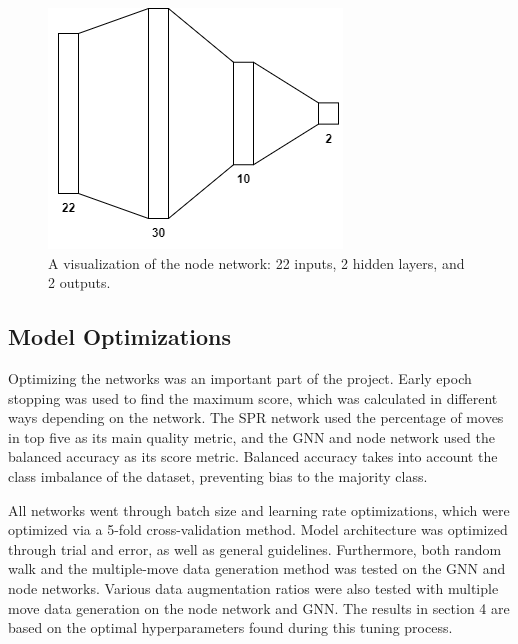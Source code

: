 \documentclass{mpaper}
\begin{document}
\begin{figure}
    \includegraphics[width=1\linewidth]{dissertation/images/node_nn.png}
    \centering
    \caption{A visualization of the node network: 22 inputs, 2 hidden layers, and 2 outputs.}
\end{figure}

\vspace{10pt}

\subsection{Model Optimizations}

Optimizing the networks was an important part of the project. Early epoch stopping was used to find the maximum score, which was calculated in different ways depending on the network. The SPR network used the percentage of moves in top five as its main quality metric, and the GNN and node network used the balanced accuracy as its score metric. Balanced accuracy takes into account the class imbalance of the dataset, preventing bias to the majority class.

All networks went through batch size and learning rate optimizations, which were optimized via a 5-fold cross-validation method. Model architecture was optimized through trial and error, as well as general guidelines. Furthermore, both random walk and the multiple-move data generation method was tested on the GNN and node networks. Various data augmentation ratios were also tested with multiple move data generation on the node network and GNN. The results in section 4 are based on the optimal hyperparameters found during this tuning process.
\end{document}
